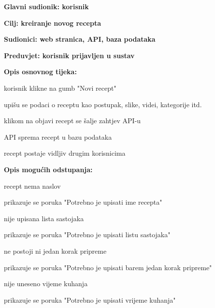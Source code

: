 				
					\noindent {}
					\begin{packed_item}
						\item \textbf{Glavni sudionik: korisnik}
						\item  \textbf{Cilj: kreiranje novog recepta}
						\item  \textbf{Sudionici: web stranica, API, baza podataka}
						\item  \textbf{Preduvjet: korisnik prijavljen u sustav}
						
						\item  \textbf{Opis osnovnog tijeka:}
						\item[] \begin{packed_enum}
							\item korisnik klikne na gumb "Novi recept"
							\item upišu se podaci o receptu kao postupak, slike, videi, kategorije itd.
							\item klikom na objavi recept se šalje zahtjev API-u
							\item API sprema recept u bazu podataka
							\item recept postaje vidljiv drugim korisnicima
						\end{packed_enum}
						
						\item  \textbf{Opis mogućih odstupanja:}
						\item[] \begin{packed_item}
							\item[6.a] recept nema naslov
							\begin{packed_enum}
								\item prikazuje se poruka "Potrebno je upisati ime recepta"
							\end{packed_enum}
							\item[6.b] nije upisana lista sastojaka
							\begin{packed_enum}
								\item prikazuje se poruka "Potrebno je upisati listu sastojaka"
							\end{packed_enum}
							\item[6.c] ne postoji ni jedan korak pripreme
							\begin{packed_enum}
								\item prikazuje se poruka "Potrebno je upisati barem jedan korak pripreme"
							\end{packed_enum}
							\item[6.d] nije uneseno vijeme kuhanja
							\begin{packed_enum}
								\item prikazuje se poruka "Potrebno je upisati vrijeme kuhanja"
							\end{packed_enum}
						\end{packed_item}
					\end{packed_item}



